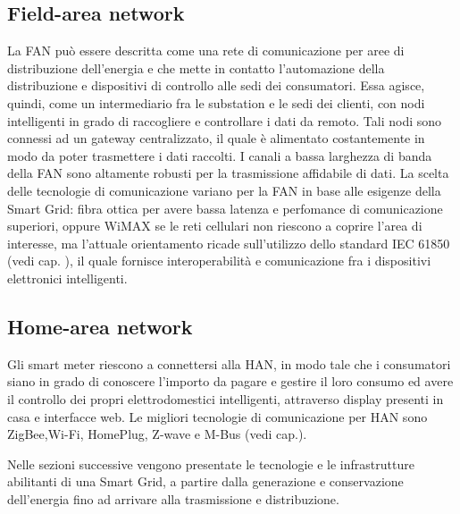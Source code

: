 \subsection{Field-area network}
La FAN può essere descritta come una rete di comunicazione per aree di distribuzione dell'energia e che mette in contatto l'automazione della distribuzione e dispositivi di controllo alle sedi dei consumatori. Essa agisce, quindi, come un intermediario fra le substation e le sedi dei clienti, con nodi intelligenti in grado di raccogliere e controllare i dati da remoto. Tali nodi sono connessi ad un gateway centralizzato, il quale è alimentato costantemente in modo da poter trasmettere i dati raccolti. I canali a bassa larghezza di banda della FAN sono altamente robusti per la trasmissione affidabile di dati. 
\newline 
La scelta delle tecnologie di comunicazione  variano per la FAN in base alle esigenze della Smart Grid: fibra ottica per avere bassa latenza e perfomance di comunicazione superiori, oppure WiMAX se le reti cellulari non riescono a coprire l'area di interesse, ma l'attuale orientamento ricade sull'utilizzo dello standard IEC 61850 (vedi cap. ), il quale fornisce interoperabilità e comunicazione fra i dispositivi elettronici intelligenti.

\subsection{Home-area network}{
Gli smart meter riescono a connettersi alla HAN, in modo tale che i consumatori siano in grado di conoscere l'importo da pagare e gestire il loro consumo ed avere il controllo dei propri elettrodomestici intelligenti, attraverso display presenti in casa e interfacce web. 
\newline 
Le migliori tecnologie di comunicazione per HAN sono ZigBee,Wi-Fi, HomePlug, Z-wave e M-Bus (vedi cap.).
}

\vspace{20pt}\hspace{-17pt}Nelle sezioni successive vengono presentate le tecnologie e le infrastrutture abilitanti di una Smart Grid, a partire dalla generazione e conservazione dell'energia fino ad arrivare alla trasmissione e distribuzione.

